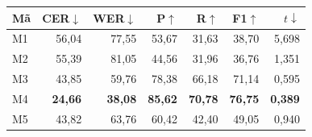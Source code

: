 \begin{tabular*}{\linewidth}{@{\extracolsep{\fill}}lrrrrrr@{}}
\toprule
\textbf{Mã} & \textbf{CER}$\downarrow$ & \textbf{WER}$\downarrow$ &
\textbf{P}$\uparrow$ & \textbf{R}$\uparrow$ & \textbf{F1}$\uparrow$ & $t\downarrow$ \\
\midrule
M1 & 56,04 & 77,55 & 53,67 & 31,63 & 38,70 & 5,698 \\
M2 & 55,39 & 81,05 & 44,56 & 31,96 & 36,76 & 1,351 \\
M3 & 43,85 & 59,76 & 78,38 & 66,18 & 71,14 & 0,595 \\
M4 & \textbf{24,66} & \textbf{38,08} & \textbf{85,62} & \textbf{70,78} & \textbf{76,75} & \textbf{0,389} \\
M5 & 43,82 & 63,76 & 60,42 & 42,40 & 49,05 & 0,940 \\
\bottomrule
\end{tabular*}
